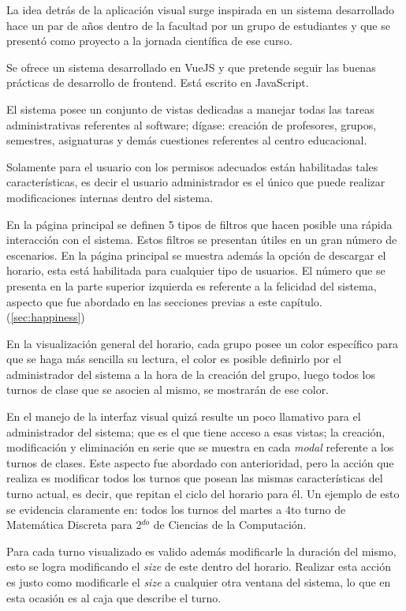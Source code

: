La idea detrás de la aplicación visual surge inspirada en un sistema desarrollado hace un par de años dentro de la facultad por un grupo de estudiantes y que se presentó como proyecto a la jornada científica de ese curso. 

Se ofrece un sistema desarrollado en VueJS y que pretende seguir las buenas prácticas de desarrollo de frontend. Está escrito en JavaScript.

El sistema posee un conjunto de vistas dedicadas a manejar todas las tareas administrativas referentes al software; dígase: creación de profesores, grupos, semestres, asignaturas y demás cuestiones referentes al centro educacional. 

Solamente para el usuario con los permisos adecuados están habilitadas tales características, es decir el usuario administrador es el único que puede realizar modificaciones internas dentro del sistema.

En la página principal se definen 5 tipos de filtros que hacen posible una rápida interacción con el sistema. Estos filtros se presentan útiles en un gran número de escenarios. En la página principal se muestra además la opción de descargar el horario, esta está habilitada para cualquier tipo de usuarios. El número que se presenta en la parte superior izquierda es referente a la felicidad del sistema, aspecto que fue abordado en las secciones previas a este capítulo. (\ref{sec:happiness})

En la visualización general del horario, cada grupo posee un color específico para que se haga más sencilla su lectura, el color es posible definirlo por el administrador del sistema a la hora de la creación del grupo, luego todos los turnos de clase que se asocien al mismo, se mostrarán de ese color.

En el manejo de la interfaz visual quizá resulte un poco llamativo para el administrador del sistema; que es el que tiene acceso a esas vistas; la creación, modificación y eliminación en serie que se muestra en cada \textit{modal} referente a los turnos de clases.  Este aspecto fue abordado con anterioridad, pero la acción que realiza es modificar todos los turnos que posean las mismas características del turno actual, es decir, que repitan el ciclo del horario para él. Un ejemplo de esto se evidencia claramente en: todos los turnos del martes a 4to turno de Matemática Discreta para 2$^{do}$ de Ciencias de la Computación.

Para cada turno visualizado es valido además modificarle la duración del mismo, esto se logra modificando el \textit{size} de este dentro del horario. Realizar esta acción es justo como modificarle el \textit{size} a cualquier otra ventana del sistema, lo que en esta ocasión es al caja que describe el turno.


